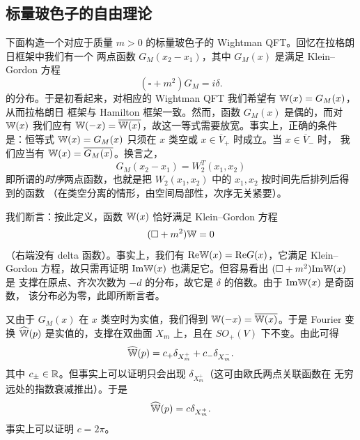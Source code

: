
\subsection{标量玻色子的自由理论}

下面构造一个对应于质量 $m>0$ 的标量玻色子的 Wightman QFT。回忆在拉格朗日框架中我们有一个
两点函数 $G_M(x_2-x_1)$，其中 $G_M(x)$ 是满足 Klein--Gordon 方程
$$
(\square+m^2)G_M=i\delta.
$$  
的分布。于是初看起来，对相应的 Wightman QFT 我们希望有 $\Bbb W(x)=G_M(x)$，从而拉格朗日
框架与 Hamilton 框架一致。然而，函数 $G_M(x)$ 是偶的，而对 $\Bbb W(x)$ 我们应有
$\Bbb W(-x)=\overline{\Bbb W(x)}$，故这一等式需要放宽。事实上，正确的条件是：恒等式
$\Bbb W(x)=G_M(x)$ 只须在 $x$ 类空或 $x\in \overline V_+$ 时成立。当 $x\in \overline V_-$ 时，
我们应当有 $\Bbb W(x)=\overline{G_M(x)}$。换言之，
$$
G_M(x_2-x_1)=W_2^T(x_1,x_2)
$$ 
即所谓的\emph{时序}两点函数，也就是把 $W_2(x_1,x_2)$ 中的 $x_1,x_2$ 按时间先后排列后得到的函数
（在类空分离的情形，由空间局部性，次序无关紧要）。

我们断言：按此定义，函数 $\Bbb W(x)$ 恰好满足 Klein--Gordon 方程
$$
(\square+m^2)\Bbb W=0
$$
（右端没有 delta 函数）。事实上，我们有 ${\rm Re}\Bbb W(x)={\rm Re}G(x)$，它满足 Klein--Gordon
方程，故只需再证明 ${\rm Im}\Bbb W(x)$ 也满足它。但容易看出 $(\square+m^2){\rm Im}\Bbb W(x)$ 是
支撑在原点、齐次次数为 $-d$ 的分布，故它是 $\delta$ 的倍数。由于 ${\rm Im}\Bbb W(x)$ 是奇函数，
该分布必为零，此即所断言者。

又由于 $G_M(x)$ 在 $x$ 类空时为实值，我们得到 $\Bbb W(-x)=\overline{\Bbb W(x)}$。于是 Fourier
变换 $\widehat {\Bbb W}(p)$ 是实值的，支撑在双曲面 $X_m$ 上，且在 $SO_+(V)$ 下不变。由此可得
$$
\widehat {\Bbb W}(p)=c_+\delta_{X_m^+}+c_-\delta_{X_m^-}.
$$ 
其中 $c_\pm \in \Bbb R$。但事实上可以证明只会出现 $\delta_{X_m^+}$（这可由欧氏两点关联函数在
无穷远处的指数衰减推出）。于是
$$
\widehat {\Bbb W}(p)=c\delta_{X_m^+}. 
$$ 
事实上可以证明 $c=2\pi$。

